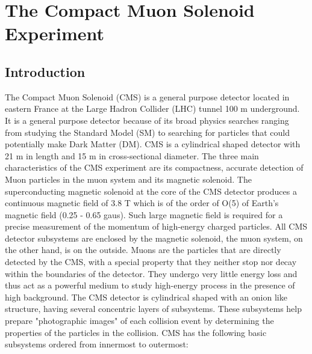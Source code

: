 




\section{The Compact Muon Solenoid Experiment}
\subsection{Introduction}
The Compact Muon Solenoid (CMS) is a general purpose detector located in eastern France at the Large Hadron Collider (LHC) tunnel 100 m underground. It is a general purpose detector because of its broad physics searches ranging from studying the Standard Model (SM) to searching for particles that could potentially make Dark Matter (DM). CMS is a cylindrical shaped detector with 21 m in length and 15 m in cross-sectional diameter. The three main characteristics of the CMS experiment are its compactness, accurate detection of Muon particles in the muon system and its magnetic solenoid. The superconducting magnetic solenoid at the core of the CMS detector produces a continuous magnetic field of 3.8 T which is of the order of O(5) of Earth's magnetic field (0.25 - 0.65 gaus). Such large magnetic field is required for a precise measurement of the momentum of high-energy charged particles. All CMS detector subsystems are enclosed by the magnetic solenoid, the muon system, on the other hand, is on the outside. Muons are the particles that are directly detected by the CMS, with a special property that they neither stop nor decay within the boundaries of the detector. They undergo very little energy loss and thus act as a powerful medium to study high-energy process in the presence of high background.
The CMS detector is cylindrical shaped with an onion like structure, having several concentric layers of subsystems. These subsystems help prepare "photographic images" of each collision event by determining the properties of the particles in the collision. CMS has the following basic subsystems ordered from innermost to outermost:

